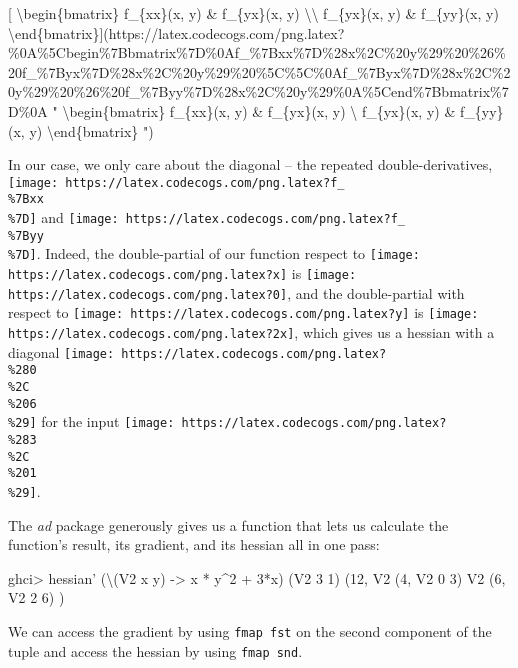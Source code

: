 \documentclass[]{article}
\newenvironment{Shaded}{}{}
\newcommand{\DataTypeTok}[1]{\textcolor[rgb]{0.56,0.13,0.00}{#1}}
\newcommand{\DecValTok}[1]{\textcolor[rgb]{0.25,0.63,0.44}{#1}}
\newcommand{\FunctionTok}[1]{\textcolor[rgb]{0.02,0.16,0.49}{#1}}
\newcommand{\NormalTok}[1]{#1}
\newcommand{\OtherTok}[1]{\textcolor[rgb]{0.00,0.44,0.13}{#1}}
\begin{document}
{[} \textbackslash{}begin\{bmatrix\} f\_\{xx\}(x, y) \& f\_\{yx\}(x, y)
\textbackslash{}\textbackslash{} f\_\{yx\}(x, y) \& f\_\{yy\}(x, y)
\textbackslash{}end\{bmatrix\}{]}(https://latex.codecogs.com/png.latex?\%0A\%5Cbegin\%7Bbmatrix\%7D\%0Af\_\%7Bxx\%7D\%28x\%2C\%20y\%29\%20\%26\%20f\_\%7Byx\%7D\%28x\%2C\%20y\%29\%20\%5C\%5C\%0Af\_\%7Byx\%7D\%28x\%2C\%20y\%29\%20\%26\%20f\_\%7Byy\%7D\%28x\%2C\%20y\%29\%0A\%5Cend\%7Bbmatrix\%7D\%0A
" \textbackslash{}begin\{bmatrix\} f\_\{xx\}(x, y) \& f\_\{yx\}(x, y)
\textbackslash{} f\_\{yx\}(x, y) \& f\_\{yy\}(x, y)
\textbackslash{}end\{bmatrix\} ")

In our case, we only care about the diagonal -- the repeated double-derivatives,
\texttt{[image: https://latex.codecogs.com/png.latex?f\_\\\%7Bxx\\\%7D]} and
\texttt{[image: https://latex.codecogs.com/png.latex?f\_\\\%7Byy\\\%7D]}. Indeed, the
double-partial of our function respect to
\texttt{[image: https://latex.codecogs.com/png.latex?x]} is
\texttt{[image: https://latex.codecogs.com/png.latex?0]}, and the double-partial
with respect to \texttt{[image: https://latex.codecogs.com/png.latex?y]} is
\texttt{[image: https://latex.codecogs.com/png.latex?2x]}, which gives us a
hessian with a diagonal
\texttt{[image: https://latex.codecogs.com/png.latex?\\\%280\\\%2C\\\%206\\\%29]} for
the input
\texttt{[image: https://latex.codecogs.com/png.latex?\\\%283\\\%2C\\\%201\\\%29]}.

The \emph{ad} package generously gives us a function that lets us calculate the
function's result, its gradient, and its hessian all in one pass:

\begin{Shaded}
\begin{Highlighting}[]
\NormalTok{ghci}\FunctionTok{>}\NormalTok{ hessian' (\textbackslash{}(}\DataTypeTok{V2}\NormalTok{ x y) }\OtherTok{->}\NormalTok{ x }\FunctionTok{*}\NormalTok{ y}\FunctionTok{^}\DecValTok{2} \FunctionTok{+} \DecValTok{3}\FunctionTok{*}\NormalTok{x) (}\DataTypeTok{V2} \DecValTok{3} \DecValTok{1}\NormalTok{)}
\NormalTok{(}\DecValTok{12}\NormalTok{, }\DataTypeTok{V2}\NormalTok{ (}\DecValTok{4}\NormalTok{, }\DataTypeTok{V2} \DecValTok{0} \DecValTok{3}\NormalTok{)}
     \DataTypeTok{V2}\NormalTok{ (}\DecValTok{6}\NormalTok{, }\DataTypeTok{V2} \DecValTok{2} \DecValTok{6}\NormalTok{)}
\NormalTok{)}
\end{Highlighting}
\end{Shaded}

We can access the gradient by using \texttt{fmap\ fst} on the second component
of the tuple and access the hessian by using \texttt{fmap\ snd}.
\end{document}
